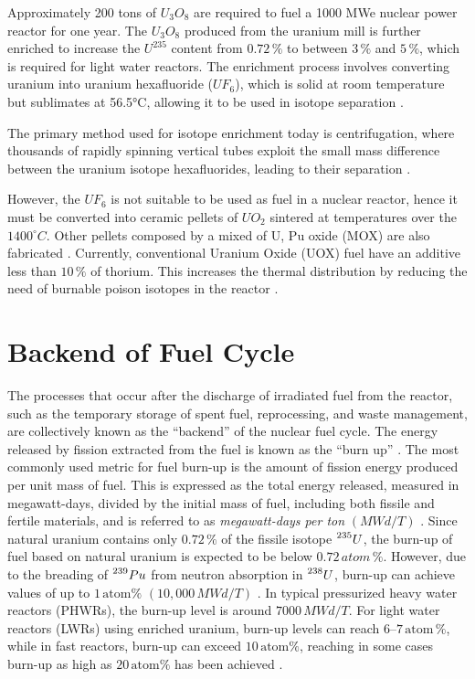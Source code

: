 Approximately 200 tons of \(U_3O_8\) are required to fuel a 1000 MWe nuclear power reactor for one year. The \(U_3O_8\) produced from the uranium mill is further enriched to increase the \(U^{235}\) content from \(0.72 \, \%\) to between \(3 \, \%\) and \(5 \, \%\), which is required for light water reactors. The enrichment process involves converting uranium into uranium hexafluoride (\(UF_6\)), which is solid at room temperature but sublimates at 56.5°C, allowing it to be used in isotope separation \cite{fuel_cycle_book}.

The primary method used for isotope enrichment today is centrifugation, where thousands of rapidly spinning vertical tubes exploit the small mass difference between the uranium isotope hexafluorides, leading to their separation \cite{fuel_cycle_book}.

However, the \(UF_6\) is not suitable to be used as fuel in a nuclear reactor, hence it must be converted into ceramic pellets of \(UO_2\) sintered at temperatures over the \(1400^{\circ}C\). Other pellets composed by a mixed of U, Pu oxide (MOX) are also fabricated \cite{fuel_cycle_book}. Currently, conventional Uranium Oxide (UOX) fuel have an additive less than \(10 \, \%\) of thorium. This increases the thermal distribution by reducing the need of burnable poison isotopes in the reactor \cite{Th_cycle_viability}.

\section{Backend of Fuel Cycle}

The processes that occur after the discharge of irradiated fuel from the reactor, such as the temporary storage of spent fuel, reprocessing, and waste management, are collectively known as the ``backend'' of the nuclear fuel cycle. The energy released by fission extracted from the fuel is known as the ``burn up'' \cite{fuel_cycle_book}. The most commonly used metric for fuel burn-up is the amount of fission energy produced per unit mass of fuel. This is expressed as the total energy released, measured in megawatt-days, divided by the initial mass of fuel, including both fissile and fertile materials, and is referred to as \textit{megawatt-days per ton} \((MWd/T)\) \cite{nuclear_reactors_adv}. Since natural uranium contains only \(0.72 \, \%\) of the fissile isotope \(\prescript{235}{}{U}\), the burn-up of fuel based on natural uranium is expected to be below \(0.72 \, atom \, \%\). However, due to the breading of \(\prescript{239}{}{Pu}\) from neutron absorption in \(\prescript{238}{}{U}\), burn-up can achieve values of up to \(1 \, \text{atom} \%\) \((10,000 \, MWd/T)\) \cite{fuel_cycle_book}. In typical pressurized heavy water reactors (PHWRs), the burn-up level is around \(7000 \, MWd/T\). For light water reactors (LWRs) using enriched uranium, burn-up levels can reach \(6–7 \, \text{atom} \, \%\), while in fast reactors, burn-up can exceed \(10 \, \text{atom} \%\), reaching in some cases burn-up as high as \(20 \, \text{atom} \%\) has been achieved \cite{fuel_cycle_book}.


